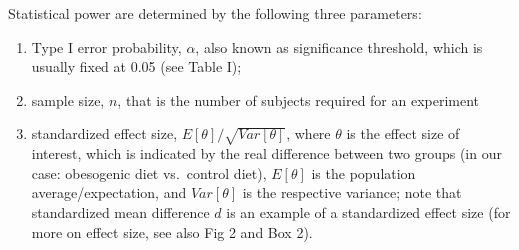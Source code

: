 \documentclass[
]{article}
\begin{document}
Statistical power are determined by the following three parameters:

\begin{enumerate}
\def\labelenumi{(\arabic{enumi})}
\item
  Type I error probability, \(\alpha\), also known as significance
  threshold, which is usually fixed at 0.05 (see Table I);
\item
  sample size, \(n\), that is the number of subjects required for an
  experiment
\item
  standardized effect size, \(E[\theta]/\sqrt{Var[\theta]}\), where
  \(\theta\) is the effect size of interest, which is indicated by the
  real difference between two groups (in our case: obesogenic diet
  vs.~control diet), \(E[\theta]\) is the population
  average/expectation, and \(Var[\theta]\) is the respective variance;
  note that standardized mean difference \(d\) is an example of a
  standardized effect size (for more on effect size, see also Fig 2 and
  Box 2).
\end{enumerate}
\end{document}
